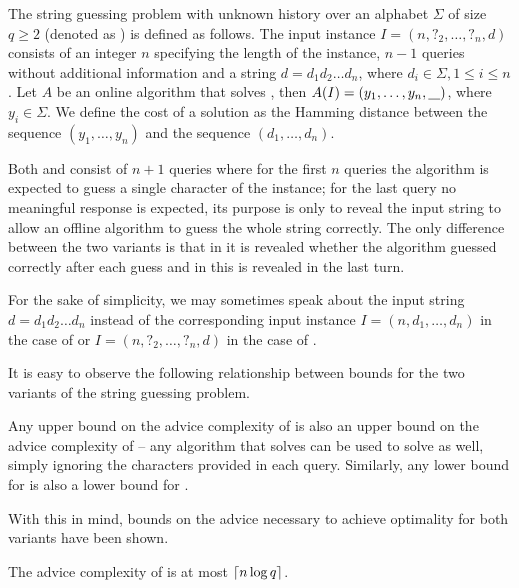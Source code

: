 \begin{definition}
    The string guessing problem with unknown history over an alphabet
    $\Sigma$ of size $q \geq 2$ (denoted as ) is defined as
    follows. The input instance $I = (n, ?_2, \dots, ?_n, d)$ consists of
    an integer $n$ specifying the length of the instance, $n-1$ queries
    without additional information and a string $d = d_1d_2\dots{}d_n$,
    where $d_i \in \Sigma, 1 \leq i \leq n$. Let $A$ be an online
    algorithm that solves , then $A(I) = (y_1, \dots, y_n,
    \underline{\hspace*{0.3cm}})$, where $y_i \in \Sigma$. We define the cost of a
    solution as the Hamming distance between the sequence $(y_1, \dots,
    y_n)$ and the sequence $(d_1, \dots, d_n)$.
\end{definition}

Both  and  consist of $n + 1$ queries where for the first
$n$ queries the algorithm is expected to guess a single character of the
instance; for the last query no meaningful response is expected, its
purpose is only to reveal the input string to allow an offline algorithm
to guess the whole string correctly. The only difference between the two
variants is that in  it is revealed whether the algorithm guessed
correctly after each guess and in  this is revealed in the last
turn.

For the sake of simplicity, we may sometimes speak about the input string
$d = d_1d_2\dots{}d_n$ instead of the corresponding input instance $I =
(n, d_1, \dots, d_n)$ in the case of  or $I = (n, ?_2, \dots, ?_n,
d)$ in the case of .

It is easy to observe the following relationship between bounds for the
two variants of the string guessing problem.

\begin{observation}\label{observation:sguh-sgkh-bounds}
    Any upper bound on the advice complexity of  is also an upper
    bound on the advice complexity of  -- any algorithm that
    solves  can be used to solve  as well, simply ignoring
    the characters provided in each query. Similarly, any lower bound for
     is also a lower bound for .
\end{observation}

With this in mind, bounds on the advice necessary to achieve optimality
for both variants have been shown.

\begin{theorem}\label{theorem:sgkh-upper}\label{theorem:sguh-upper}
    The advice complexity of  is at most $\lceil n \log q\rceil$.
\end{theorem}

